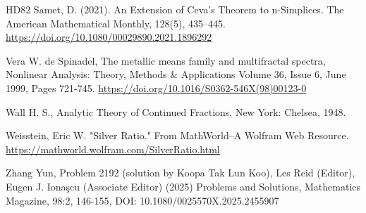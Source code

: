 \documentclass{article}
\begin{document}
\begin{thebibliography}{HD82}
 Samet, D. (2021). An Extension of Ceva’s Theorem to n-Simplices. The American Mathematical Monthly, 128(5), 435–445. \url{https://doi.org/10.1080/00029890.2021.1896292}

Vera W. de Spinadel, 
The metallic means family and multifractal spectra, Nonlinear Analysis: Theory, Methods \& Applications
Volume 36, Issue 6, June 1999, Pages 721-745. \url{
https://doi.org/10.1016/S0362-546X(98)00123-0}

 Wall H. S., Analytic Theory of Continued Fractions, New York: Chelsea, 1948.

 Weisstein, Eric W. "Silver Ratio." From MathWorld--A Wolfram Web Resource. \url{https://mathworld.wolfram.com/SilverRatio.html}

 Zhang Yun, Problem
2192 (solution by Koopa Tak Lun Koo), Les Reid (Editor), Eugen J. Ionaşcu (Associate Editor) (2025) Problems and
Solutions, Mathematics Magazine, 98:2, 146-155, DOI: 10.1080/0025570X.2025.2455907
\end{thebibliography}
\end{document}
